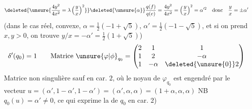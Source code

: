 \[
\deleted{\unsure{\frac{4y^2}{4x^2}=\lambda\left(\frac yx\right)^2}}\deleted{\unsure{\alpha}}\frac{q(f)}{q(e)}=\frac{4y^2}{4x^2}=\left(\frac yx\right)^2=\alpha'^2\quad\text{donc}\quad\frac yx=\pm\alpha'
\]
(dans le cas réel,  convexe, $\alpha=\frac12(-1+\sqrt5)$, $\alpha'=\frac12(-1-\sqrt5)$,  et si on prend $x,y>0$, on trouve $y/x=-\alpha'=\frac12(1+\sqrt5)$)
\[
\delta'(q_0)=1\qquad\text{Matrice }\unsure{\varphi|\phi}_{q_0}=\begin{pmatrix}2&1&1\\1&2&-\alpha\\1&-\alpha&\deleted{\unsure{0}}2\end{pmatrix}
\]
Matrice non singulière sauf en car. $2$, où le noyau de $\varphi_{q_0}$ est engendré par le vecteur $u=(\alpha',1-\alpha',1-\alpha')=(\alpha',\alpha,\alpha)=(1+\alpha,\alpha,\alpha)$ NB $q_0(u)=\alpha'\ne0$, ce qui exprime la  de $q_0$ en car. $2$)
